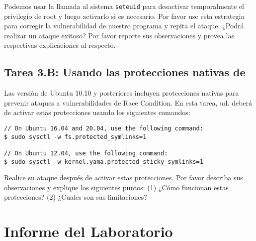 Podemos usar la llamada al sistema  {\tt seteuid{}} para desactivar temporalmente el privilegio de root y luego activarlo si es necesario. Por favor use esta estrategia para corregir la vulnerabilidad de nuestro programa y repita el ataque. ¿Podrá realizar un ataque exitoso? Por favor reporte sus observaciones y provea las respectivas explicaciones al respecto.


\subsection{Tarea 3.B: Usando las protecciones nativas de \ubuntu}

Las versión de Ubuntu 10.10 y posteriores incluyen protecciones nativas para prevenir ataques a vulnerabilidades de Race Condition.
En esta tarea, ud. deberá de activar estas protecciones usando los siguientes comandos: 

\begin{lstlisting}
// On Ubuntu 16.04 and 20.04, use the following command:
$ sudo sysctl -w fs.protected_symlinks=1

// On Ubuntu 12.04, use the following command:
$ sudo sysctl -w kernel.yama.protected_sticky_symlinks=1
\end{lstlisting}

Realice su ataque después de activar estas protecciones.
Por favor describa sus observaciones y explique los siguientes puntos:
(1) ¿Cómo funcionan estas protecciones? 
(2) ¿Cuales son sus limitaciones?




\section{Informe del Laboratorio}





